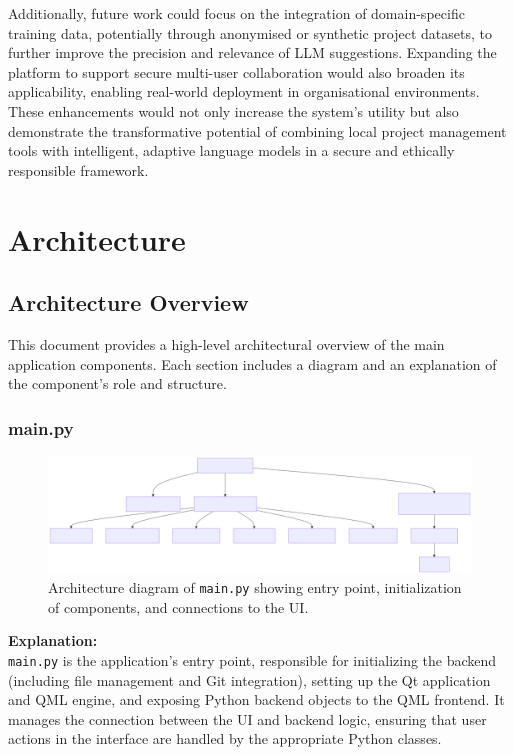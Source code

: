 \documentclass{report}
\begin{document}
Additionally, future work could focus on the integration of domain-specific training data, potentially through anonymised or synthetic project datasets, to further improve the precision and relevance of LLM suggestions. Expanding the platform to support secure multi-user collaboration would also broaden its applicability, enabling real-world deployment in organisational environments. These enhancements would not only increase the system's utility but also demonstrate the transformative potential of combining local project management tools with intelligent, adaptive language models in a secure and ethically responsible framework.



\printbibliography%


\appendix
\chapter{Architecture}

\section{Architecture Overview}

This document provides a high-level architectural overview of the main application components. Each section includes a diagram and an explanation of the component's role and structure.
\subsection{main.py}

\begin{figure}[h]
\centering
\includegraphics[width=\textwidth]{png_files/main_py_architecture.png}
\caption{Architecture diagram of \texttt{main.py} showing entry point, initialization of components, and connections to the UI.}
\end{figure}

\noindent
\textbf{Explanation:} \\
\texttt{main.py} is the application's entry point, responsible for initializing the backend (including file management and Git integration), setting up the Qt application and QML engine, and exposing Python backend objects to the QML frontend. It manages the connection between the UI and backend logic, ensuring that user actions in the interface are handled by the appropriate Python classes.
\end{document}
